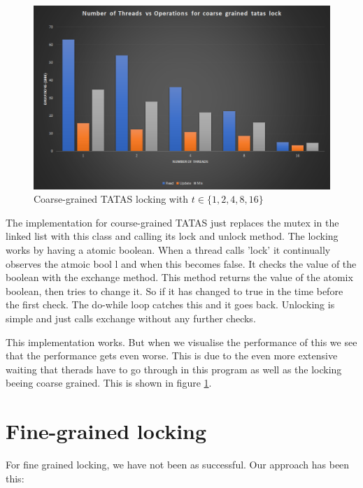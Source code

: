 \begin{figure}
    \centering
    \includegraphics[width=\linewidth]{Figures/coarsegrainedtatas.png}
    \caption{Coarse-grained TATAS locking with $t \in \{1, 2, 4, 8, 16\}$}
    \label{fig:coarsegrainedtatas}
\end{figure}


The implementation for course-grained TATAS just replaces the mutex in the
linked list with this class and calling its lock and unlock method.
The locking works by having a atomic boolean. When a thread calls 'lock'
it continually observes the atmoic bool l and when this becomes false. It checks
the value of the boolean with the exchange method. This method returns the value
of the atomix boolean, then tries to change it. So if it has changed to true
in the time before the first check. The do-while loop catches this and it goes 
back. Unlocking is simple and just calls exchange without any further checks.

This implementation works. But when we visualise the performance of this we see
that the performance gets even worse. This is due to the even more extensive 
waiting that therads have to go through in this program as well as the locking
beeing coarse grained. This is shown in figure \ref{fig:coarsegrainedtatas}.

\section{Fine-grained locking}

For fine grained locking, we have not been as successful. Our approach has been
this:

